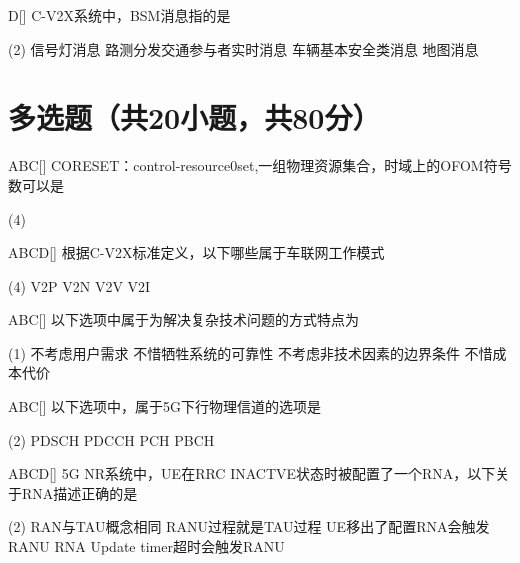 \begin{choice}{D}[]
    C-V2X系统中，BSM消息指的是
    \begin{tasks}(2)
        \task 信号灯消息
        \task 路测分发交通参与者实时消息
        \task 车辆基本安全类消息
        \task 地图消息
    \end{tasks}
\end{choice}

\section{多选题（共20小题，共80分）}

\begin{choice}{\;ABC\;}[]
    CORESET：control-resource0set,一组物理资源集合，时域上的OFOM符号数可以是
    \begin{tasks}(4)
    \end{tasks}
\end{choice}

\begin{choice}{\;ABCD\;}[]
    根据C-V2X标准定义，以下哪些属于车联网工作模式
    \begin{tasks}(4)
        \task V2P
        \task V2N
        \task V2V
        \task V2I
    \end{tasks}
\end{choice}

\begin{choice}{\;ABC\;}[]
    以下选项中属于为解决复杂技术问题的方式特点为
    \begin{tasks}(1)
        \task 不考虑用户需求
        \task 不惜牺牲系统的可靠性
        \task 不考虑非技术因素的边界条件
        \task 不惜成本代价
    \end{tasks}
\end{choice}

\begin{choice}{\;ABC\;}[]
    以下选项中，属于5G下行物理信道的选项是
    \begin{tasks}(2)
        \task PDSCH
        \task PDCCH
        \task PCH
        \task PBCH
    \end{tasks}
\end{choice}


\begin{choice}{\;ABCD\;}[]
    5G NR系统中，UE在RRC INACTVE状态时被配置了一个RNA，以下关于RNA描述正确的是
    \begin{tasks}(2)
        \task RAN与TAU概念相同
        \task RANU过程就是TAU过程
        \task UE移出了配置RNA会触发RANU
        \task RNA Update timer超时会触发RANU
    \end{tasks}
\end{choice}

